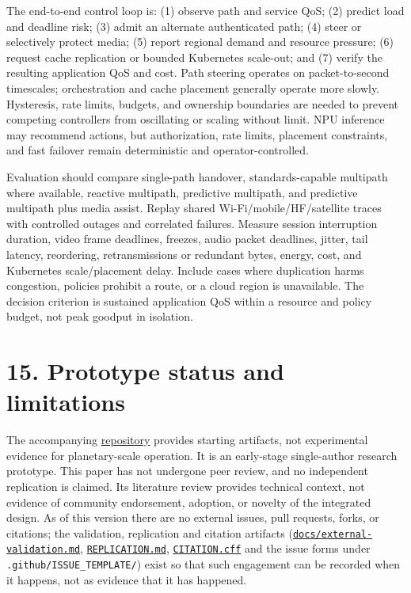 \documentclass[
  american,
  11pt,
]{article}
\begin{document}
The end-to-end control loop is: (1) observe path and service QoS; (2)
predict load and deadline risk; (3) admit an alternate authenticated
path; (4) steer or selectively protect media; (5) report regional demand
and resource pressure; (6) request cache replication or bounded
Kubernetes scale-out; and (7) verify the resulting application QoS and
cost. Path steering operates on packet-to-second timescales;
orchestration and cache placement generally operate more slowly.
Hysteresis, rate limits, budgets, and ownership boundaries are needed to
prevent competing controllers from oscillating or scaling without limit.
NPU inference may recommend actions, but authorization, rate limits,
placement constraints, and fast failover remain deterministic and
operator-controlled.

Evaluation should compare single-path handover, standards-capable
multipath where available, reactive multipath, predictive multipath, and
predictive multipath plus media assist. Replay shared
Wi-Fi/mobile/HF/satellite traces with controlled outages and correlated
failures. Measure session interruption duration, video frame deadlines,
freezes, audio packet deadlines, jitter, tail latency, reordering,
retransmissions or redundant bytes, energy, cost, and Kubernetes
scale/placement delay. Include cases where duplication harms congestion,
policies prohibit a route, or a cloud region is unavailable. The
decision criterion is sustained application QoS within a resource and
policy budget, not peak goodput in isolation.

\section{15. Prototype status and
limitations}\label{prototype-status-and-limitations}

The accompanying \href{../README.md}{repository} provides starting
artifacts, not experimental evidence for planetary-scale operation. It
is an early-stage single-author research prototype. This paper has not
undergone peer review, and no independent replication is claimed. Its
literature review provides technical context, not evidence of community
endorsement, adoption, or novelty of the integrated design. As of this
version there are no external issues, pull requests, forks, or
citations; the validation, replication and citation artifacts
(\href{../docs/external-validation.md}{\texttt{docs/external-validation.md}},
\href{../REPLICATION.md}{\texttt{REPLICATION.md}},
\href{../CITATION.cff}{\texttt{CITATION.cff}} and the issue forms under
\texttt{.github/ISSUE\_TEMPLATE/}) exist so that such engagement can be
recorded when it happens, not as evidence that it has happened.
\end{document}
